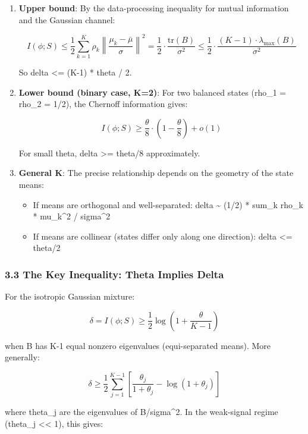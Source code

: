 \documentclass[
  12pt,
]{article}
\providecommand{\tightlist}{%
  \setlength{\itemsep}{0pt}\setlength{\parskip}{0pt}}
\begin{document}
\begin{enumerate}
\def\labelenumi{\arabic{enumi}.}
\item
  \textbf{Upper bound}: By the data-processing inequality for mutual
  information and the Gaussian channel:

  \[I(\phi; S) \leq \frac{1}{2} \sum_{k=1}^K \rho_k \left\|\frac{\mu_k - \bar{\mu}}{\sigma}\right\|^2 = \frac{1}{2} \cdot \frac{\text{tr}(B)}{\sigma^2} \leq \frac{1}{2} \cdot \frac{(K-1) \cdot \lambda_{\max}(B)}{\sigma^2}\]

  So delta \textless= (K-1) * theta / 2.
\item
  \textbf{Lower bound (binary case, K=2)}: For two balanced states
  (rho\_1 = rho\_2 = 1/2), the Chernoff information gives:

  \[I(\phi; S) \geq \frac{\theta}{8} \cdot \left(1 - \frac{\theta}{8}\right) + o(1)\]

  For small theta, delta \textgreater= theta/8 approximately.
\item
  \textbf{General K}: The precise relationship depends on the geometry
  of the state means:

  \begin{itemize}
  \tightlist
  \item
    If means are orthogonal and well-separated: delta \textasciitilde{}
    (1/2) * sum\_k rho\_k * \textbar\textbar mu\_k\textbar\textbar\^{}2
    / sigma\^{}2
  \item
    If means are collinear (states differ only along one direction):
    delta \textless= theta/2
  \end{itemize}
\end{enumerate}

\subsubsection{3.3 The Key Inequality: Theta Implies
Delta}\label{the-key-inequality-theta-implies-delta}

For the isotropic Gaussian mixture:

\[\delta = I(\phi; S) \geq \frac{1}{2} \log\left(1 + \frac{\theta}{K-1}\right)\]

when B has K-1 equal nonzero eigenvalues (equi-separated means). More
generally:

\[\delta \geq \frac{1}{2} \sum_{j=1}^{K-1} \left[ \frac{\theta_j}{1+\theta_j} - \log(1+\theta_j) \right]\]

where theta\_j are the eigenvalues of B/sigma\^{}2. In the weak-signal
regime (theta\_j \textless\textless{} 1), this gives:
\end{document}
